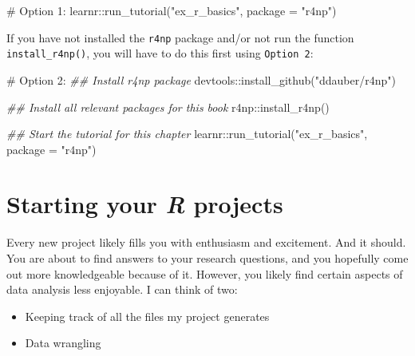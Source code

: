 \documentclass[
  letterpaper,
]{krantz}
\makeatletter
\newenvironment{Shaded}{\begin{snugshade}}{\end{snugshade}}
\newcommand{\AttributeTok}[1]{\textcolor[rgb]{0.40,0.45,0.13}{#1}}
\newcommand{\CommentTok}[1]{\textcolor[rgb]{0.37,0.37,0.37}{#1}}
\newcommand{\DocumentationTok}[1]{\textcolor[rgb]{0.37,0.37,0.37}{\textit{#1}}}
\newcommand{\FunctionTok}[1]{\textcolor[rgb]{0.28,0.35,0.67}{#1}}
\newcommand{\NormalTok}[1]{\textcolor[rgb]{0.00,0.23,0.31}{#1}}
\newcommand{\SpecialCharTok}[1]{\textcolor[rgb]{0.37,0.37,0.37}{#1}}
\newcommand{\StringTok}[1]{\textcolor[rgb]{0.13,0.47,0.30}{#1}}
\newenvironment{kframe}{%
\medskip{}
\setlength{\fboxsep}{.8em}
 \def\at@end@of@kframe{}%
 \ifinner\ifhmode%
  \def\at@end@of@kframe{\end{minipage}}%
  \begin{minipage}{\columnwidth}%
 \fi\fi%
 \def\FrameCommand##1{\hskip\@totalleftmargin \hskip-\fboxsep
 \colorbox{shadecolor}{##1}\hskip-\fboxsep
     \hskip-\linewidth \hskip-\@totalleftmargin \hskip\columnwidth}%
 \MakeFramed {\advance\hsize-\width
   \@totalleftmargin\z@ \linewidth\hsize
   \@setminipage}}%
 {\par\unskip\endMakeFramed%
 \at@end@of@kframe}
\renewenvironment{Shaded}{\begin{kframe}}{\end{kframe}}
\makeatother
\begin{document}
\begin{Shaded}
\begin{Highlighting}[]
\CommentTok{\# Option 1:}
\NormalTok{learnr}\SpecialCharTok{::}\FunctionTok{run\_tutorial}\NormalTok{(}\StringTok{"ex\_r\_basics"}\NormalTok{, }\AttributeTok{package =} \StringTok{"r4np"}\NormalTok{)}
\end{Highlighting}
\end{Shaded}

If you have not installed the \texttt{r4np} package and/or not run the
function \texttt{install\_r4np()}, you will have to do this first using
\texttt{Option\ 2}:

\begin{Shaded}
\begin{Highlighting}[]
\CommentTok{\# Option 2:}
\DocumentationTok{\#\# Install \textquotesingle{}r4np\textquotesingle{} package}
\NormalTok{devtools}\SpecialCharTok{::}\FunctionTok{install\_github}\NormalTok{(}\StringTok{"ddauber/r4np"}\NormalTok{)}

\DocumentationTok{\#\# Install all relevant packages for this book}
\NormalTok{r4np}\SpecialCharTok{::}\FunctionTok{install\_r4np}\NormalTok{()}

\DocumentationTok{\#\# Start the tutorial for this chapter}
\NormalTok{learnr}\SpecialCharTok{::}\FunctionTok{run\_tutorial}\NormalTok{(}\StringTok{"ex\_r\_basics"}\NormalTok{, }\AttributeTok{package =} \StringTok{"r4np"}\NormalTok{)}
\end{Highlighting}
\end{Shaded}


\chapter{\texorpdfstring{Starting your \emph{R}
projects}{Starting your R projects}}\label{sec-starting-your-r-projects}

Every new project likely fills you with enthusiasm and excitement. And
it should. You are about to find answers to your research questions, and
you hopefully come out more knowledgeable because of it. However, you
likely find certain aspects of data analysis less enjoyable. I can think
of two:

\begin{itemize}
\item
  Keeping track of all the files my project generates
\item
  Data wrangling
\end{itemize}
\end{document}
